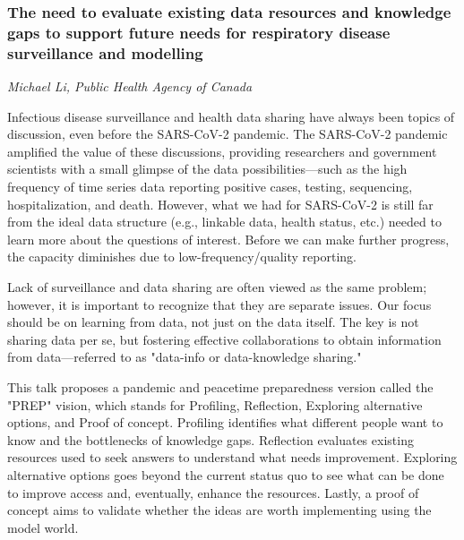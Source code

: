 \subsubsection*{The need to evaluate existing data resources and knowledge gaps to support future needs for respiratory disease surveillance and modelling}
\textit{Michael Li, Public Health Agency of Canada}

Infectious disease surveillance and health data sharing have always
been topics of discussion, even before the SARS-CoV-2 pandemic. The
SARS-CoV-2 pandemic amplified the value of these discussions,
providing researchers and government scientists with a small glimpse
of the data possibilities—such as the high frequency of time series
data reporting positive cases, testing, sequencing, hospitalization,
and death. However, what we had for SARS-CoV-2 is still far from the
ideal data structure (e.g., linkable data, health status, etc.) needed
to learn more about the questions of interest. Before we can make
further progress, the capacity diminishes due to low-frequency/quality
reporting.

Lack of surveillance and data sharing are often viewed as the same
problem; however, it is important to recognize that they are separate
issues.  Our focus should be on learning from data, not just on the
data itself. The key is not sharing data per se, but fostering
effective collaborations to obtain information from data—referred to
as "data-info or data-knowledge sharing."

This talk proposes a pandemic and peacetime preparedness version
called the "PREP" vision, which stands for Profiling, Reflection,
Exploring alternative options, and Proof of concept. Profiling
identifies what different people want to know and the bottlenecks of
knowledge gaps.  Reflection evaluates existing resources used to seek
answers to understand what needs improvement. Exploring alternative
options goes beyond the current status quo to see what can be done to
improve access and, eventually, enhance the resources. Lastly, a proof
of concept aims to validate whether the ideas are worth implementing
using the model world.
